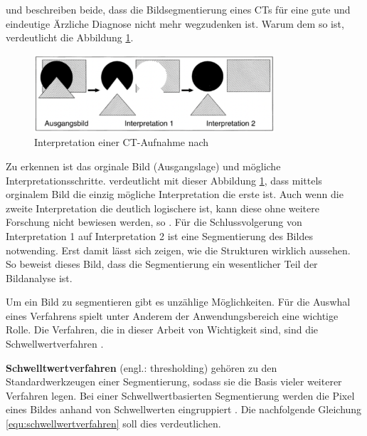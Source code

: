 \citet[Seite 95]{handels2000} und \citet[Seite 360]{lehmann2013bildverarbeitung}
beschreiben beide, dass die Bildsegmentierung eines CTs für eine gute und eindeutige
Ärzliche Diagnose nicht mehr wegzudenken ist. Warum dem so ist, verdeutlicht die
Abbildung \ref{fig:interpretation_einer_ct_aufnahem}.

\begin{figure}[h]
	\centering
	\includegraphics[width=0.8\textwidth]{img/bild_interpretation.jpg}
	\caption{Interpretation einer CT-Aufnahme nach \citet[Seite 360]{lehmann2013bildverarbeitung}}
	\label{fig:interpretation_einer_ct_aufnahem}
\end{figure}

Zu erkennen ist das orginale Bild (Ausgangslage) und mögliche
Interpretationsschritte. \citet[Seite 360]{lehmann2013bildverarbeitung} verdeutlicht
mit dieser Abbildung \ref{fig:interpretation_einer_ct_aufnahem}, dass mittels
orginalem Bild die einzig mögliche Interpretation die erste ist. Auch wenn die zweite
Interpretation die deutlich logischere ist, kann diese ohne weitere Forschung
nicht bewiesen werden, so \citet[Seite 360]{lehmann2013bildverarbeitung}. Für
die Schlussvolgerung von Interpretation 1 auf Interpretation 2 ist eine
Segmentierung des Bildes notwending. Erst damit lässt sich zeigen, wie die
Strukturen wirklich aussehen. So beweist dieses Bild, dass die Segmentierung ein
wesentlicher Teil der Bildanalyse ist.

Um ein Bild zu segmentieren gibt es unzählige Möglichkeiten. Für die Auswhal eines
Verfahrens spielt unter Anderem der Anwendungsbereich eine wichtige Rolle. Die
Verfahren, die in dieser Arbeit von Wichtigkeit sind, sind die
Schwellwertverfahren \citep[vgl.][Seite 361]{lehmann2013bildverarbeitung}.

\pagebreak

\textbf{Schwelltwertverfahren} (engl.: thresholding) gehören zu den
Standardwerkzeugen einer Segmentierung, sodass sie die Basis vieler weiterer Verfahren
legen. Bei einer Schwellwertbasierten Segmentierung werden die Pixel eines
Bildes anhand von Schwellwerten eingruppiert \citep[vgl.][Seite 96]{handels2000}.
Die nachfolgende Gleichung \ref{equ:schwellwertverfahren} soll dies verdeutlichen.

